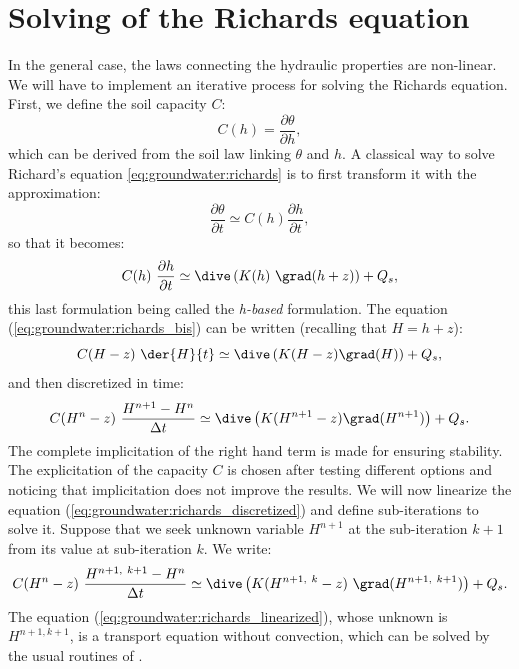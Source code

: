 \section{Solving of the Richards equation}\label{sec:groundwater:solving_richards}

In the general case, the laws connecting the hydraulic properties are non-linear.
We will have to implement an iterative process for solving the Richards equation.
First, we define the soil capacity $C$:
\begin{equation}
 \label{eq:groundwater:c_definition}
  C(h) = \frac{\partial \theta}{\partial h},
\end{equation}
which can be derived from the soil law linking $\theta$ and $h$.
A classical way to solve Richard's equation \eqref{eq:groundwater:richards} is
to first transform it with the approximation:
\begin{equation}
\label{eq:groundwater:approximation}
\frac{\partial \theta}{\partial t} \simeq C(h) \frac{\partial h}{\partial t},
\end{equation}
so that it becomes:
\begin{equation}
\label{eq:groundwater:richards_bis}
 C(h) \ \dfrac{\partial{h}}{\partial{t}} \simeq \dive \left( K(h) \ \grad(h + z) \right) + Q_s,
\end{equation}
this last formulation being called the \textit{h-based} formulation.
The equation (\eqref{eq:groundwater:richards_bis}) can be written (recalling that $H = h + z$):
\begin{equation}
\label{eq:groundwater:richards_ter}
 C(H-z) \ \der{H}{t} \simeq \dive \left( K(H-z) \grad(H) \right) + Q_s,
\end{equation}
and then discretized in time:
\begin{equation}
\label{eq:groundwater:richards_discretized}
 C(H^{n}-z) \ \frac{ H^{n+1} - H^n }{\Delta t} \simeq \dive \left( K(H^{n+1}-z) \grad(H^{n+1}) \right) + Q_s.
\end{equation}
The complete implicitation of the right hand term is made for ensuring stability. The explicitation of the capacity $C$
is chosen after testing different options and noticing that implicitation does not improve the results.
We will now linearize the equation (\eqref{eq:groundwater:richards_discretized}) and define sub-iterations to solve it.
Suppose that we seek unknown variable $H^{n+1}$ at the sub-iteration $k+1$ from its value at sub-iteration $k$.
We write:
\begin{equation}
\label{eq:groundwater:richards_linearized}
 C(H^{n}-z) \ \frac{H^{n+1, \ k+1} - H^n}{\Delta t} \simeq \dive \left( K(H^{n+1, \ k} - z) \ \grad(H^{n+1, \ k+1}) \right) + Q_s.
\end{equation}
The equation (\eqref{eq:groundwater:richards_linearized}), whose unknown is $H^{n+1, k+1}$,
is a transport equation without convection, which can be solved by the usual routines of \CS.

